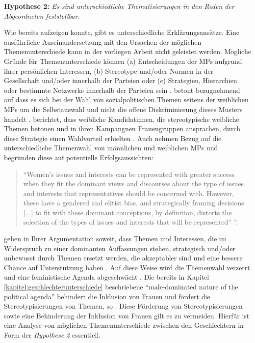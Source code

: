 \documentclass[12pt, 
    twoside=false, 
    bibliography=totoc, 
    numbers=endperiod, 
    headings=normal, 
    toc=chapterentrydotfill
    ]{scrbook}
\begin{document}
\textbf{Hypothese 2:} \emph{Es sind unterschiedliche Thematisierungen in den Reden der Abgeordneten feststellbar.}

Wie \textcite{back_2014} bereits aufzeigen konnte, gibt es unterschiedliche Erklärungsansätze. Eine ausführliche Auseinandersetzung mit den Ursachen der möglichen Themenunterschiede kann in der vorliegen Arbeit nicht geleistet werden. Mögliche Gründe für Themenunterschiede können (a) Entscheidungen der MPs aufgrund ihrer persönlichen Interessen, (b) Stereotype und/oder Normen in der Gesellschaft und/oder innerhalb der Parteien oder (c) Strategien, Hierarchien oder bestimmte Netzwerke innerhalb der Parteien sein \parencites[507]{back_2014}. \textcite [250]{ennser-jedenastik_2017} betont bezugnehmend auf \textcites{baekgaard_2012}{thomas_1994} dass es sich bei der Wahl von sozialpolitischen Themen seitens der weiblichen MPs um die Selbstauswahl und nicht die offene Diskriminierung dieses Musters handelt \parencite[250]{ennser-jedenastik_2017}. \textcite{herrnson_2003} berichtet, dass weibliche Kandidatinnen, die stereotypische weibliche Themen betonen und in ihren Kampangnen Frauengruppen ansprachen, durch diese Strategie einen Wahlvorteil erhielten \parencite[250]{ennser-jedenastik_2017}. Auch \textcite{celis_2018} nehmen Bezug auf die unterschiedliche Themenwahl von männlichen und weiblichen MPs und begründen diese auf potentielle Erfolgsaussichten:

\citereset
\begin{quote}
    \enquote{Women’s issues and interests can be represented with greater success when they fit the dominant views and discourses about the type of issues and interests that representatives should be concerned with. However, these have a gendered and elitist bias, and strategically framing decisions [...] to fit with these dominant conceptions, by definition, distorts the selection of the types of issues and interests that will be represented” \parencite[151]{celis_2018}}.
\end{quote}

\textcite{celis_2018} gehen in Ihrer Argumentation soweit, dass Themen und Interessen, die im Widerspruch zu einer dominanten Auffassungen stehen, strategisch und/oder unbewusst durch Themen ersetzt werden, die akzeptabler sind und eine bessere Chance auf Unterstützung haben \parencites[151]{celis_2018}{swers_2002}. 
Auf diese Weise wird die Themenwahl verzerrt und eine feministische Agenda abgeschwächt \parencite[151]{celis_2018}. Die bereits in Kapitel \ref{kapitel:geschlechterunterschiede} beschriebene \enquote{male-dominated nature of the political agenda} \parencite[151]{celis_2018} behindert die Inklusion von Frauen und fördert die Stereotypisierungen von Themen, so \textcite{celis_2018}.
Diese Förderung von Stereotypisierungen sowie eine Behinderung der Inklusion von Frauen gilt es zu vermeiden. Hierfür ist eine Analyse von möglichen Themenunterschiede zwischen den Geschlechtern in Form der \emph{Hypothese 2} essentiell. 
\end{document}
